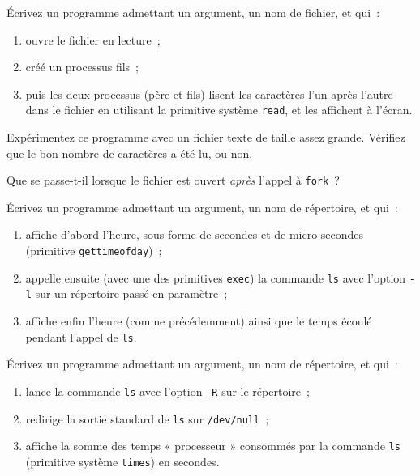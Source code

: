 Écrivez un programme admettant un argument, un nom de fichier, et qui~:
\begin {enumerate}
    \item ouvre le fichier en lecture~;
    \item créé un processus fils~;
    \item puis les deux processus (père et fils) lisent les caractères
	l'un après l'autre dans le fichier en utilisant la primitive système
	{\tt read}, et les affichent à l'écran.
\end {enumerate}
Expérimentez ce programme avec un fichier texte de taille assez grande.
Vérifiez que le bon nombre de caractères a été lu, ou non.

Que se passe-t-il lorsque le fichier est ouvert {\em après} l'appel à
{\tt fork}~?


\question

Écrivez un programme admettant un argument, un nom de répertoire,
et qui~:

\begin {enumerate}
    \item affiche d'abord l'heure, sous forme de secondes et de
	micro-secondes (primitive \texttt {gettimeofday})~;

    \item appelle ensuite (avec une des primitives \texttt {exec})
	la commande \texttt {ls} avec l'option \texttt {-l} sur un
	répertoire passé en paramètre~;

    \item affiche enfin l'heure (comme précédemment) ainsi que le
	temps écoulé pendant l'appel de \texttt {ls}.

\end {enumerate}


\question

Écrivez un programme admettant un argument, un nom de répertoire,
et qui~:

\begin {enumerate}
    \item lance la commande {\tt ls} avec l'option \texttt{-R} sur
	le répertoire~;
    \item redirige la sortie standard de {\tt ls} sur {\tt /dev/null}~;
    \item affiche la somme des temps « processeur »
	consommés par la commande {\tt ls} (primitive système {\tt times})
	en secondes.
\end {enumerate}


\question

